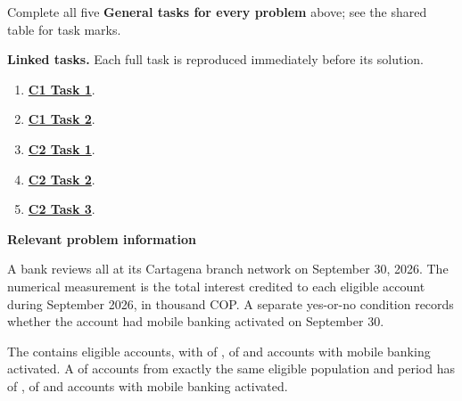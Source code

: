 Complete all five \textbf{General tasks for every problem} above; see the shared table for task marks.

\textbf{Linked tasks.} Each full task is reproduced immediately before its solution.

\begin{enumerate}[label=(\alph*),itemsep=6pt]
\item \hyperref[sol:p2c1a]{\textbf{C1 Task 1}}. \cOneA\ 
\item \hyperref[sol:p2c1b]{\textbf{C1 Task 2}}. \cOneB\ 
\item \hyperref[sol:p2c2a]{\textbf{C2 Task 1}}. \cTwoA\ 
\item \hyperref[sol:p2c2b]{\textbf{C2 Task 2}}. \cTwoB\ 
\item \hyperref[sol:p2c2c]{\textbf{C2 Task 3}}. \cTwoC\ 
\end{enumerate}
\secInicio[][sec:p2]

\clearpage



\textbf{Relevant problem information}

\begin{probleminfoexcerpt}
A bank reviews all      at its Cartagena branch network on September 30, 2026. The numerical measurement is the total interest credited to each eligible account during September 2026, in thousand COP. A separate yes-or-no condition records whether the account had mobile banking activated on September 30.
\end{probleminfoexcerpt}

\begin{probleminfoexcerpt}
The     contains  eligible accounts, with    of   ,    of    and  accounts with mobile banking activated. A     of  accounts from exactly the same eligible population and period has   of   ,    of    and  accounts with mobile banking activated.
\end{probleminfoexcerpt}

